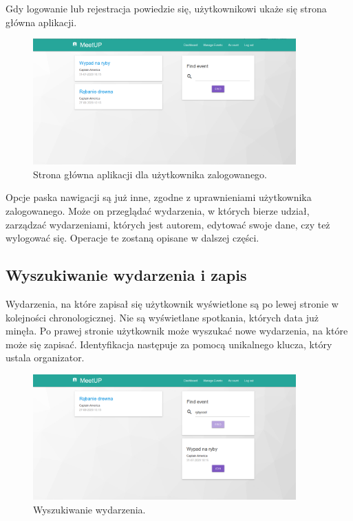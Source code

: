 \documentclass[12pt]{article}
\begin{document}
Gdy logowanie lub rejestracja powiedzie się, użytkownikowi ukaże się strona główna aplikacji.

\begin{figure}[H]
\centering
\includegraphics[width=0.9\textwidth]{meetup_dashboard.png}
\caption{Strona główna aplikacji dla użytkownika zalogowanego.}
\end{figure}

Opcje paska nawigacji są już inne, zgodne z uprawnieniami użytkownika zalogowanego. Może on przeglądać wydarzenia, w których bierze udział, zarządzać wydarzeniami, których jest autorem, edytować swoje dane, czy też wylogować się. Operacje te zostaną opisane w dalszej części.

\subsection{Wyszukiwanie wydarzenia i zapis}
Wydarzenia, na które zapisał się użytkownik wyświetlone są po lewej stronie w kolejności chronologicznej. Nie są wyświetlane spotkania, których data już minęła. Po prawej stronie użytkownik może wyszukać nowe wydarzenia, na które może się zapisać. Identyfikacja następuje za pomocą unikalnego klucza, który ustala organizator.

\begin{figure}[H]
\centering
\includegraphics[width=0.9\textwidth]{meetup_find_event.png}
\caption{Wyszukiwanie wydarzenia.}
\end{figure}
\end{document}
